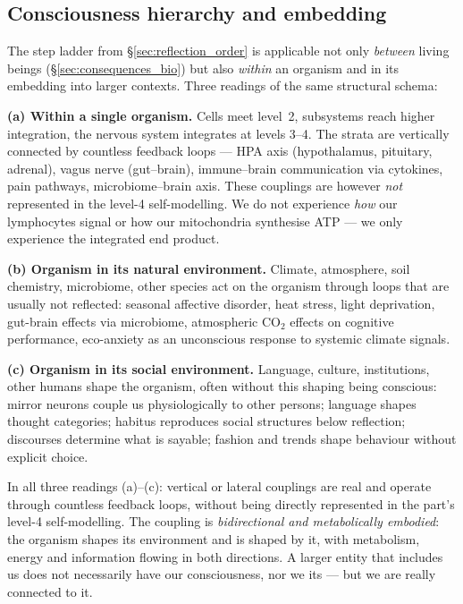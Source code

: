 \subsection{Consciousness hierarchy and embedding}\label{sec:consequences_embedding}

The step ladder from \S\ref{sec:reflection_order} is applicable not only \emph{between} living beings (\S\ref{sec:consequences_bio}) but also \emph{within} an organism and in its embedding into larger contexts. Three readings of the same structural schema:

\textbf{(a) Within a single organism.} Cells meet level~2, subsystems reach higher integration, the nervous system integrates at levels 3--4. The strata are vertically connected by countless feedback loops --- HPA axis (hypothalamus, pituitary, adrenal), vagus nerve (gut--brain), immune--brain communication via cytokines, pain pathways, microbiome--brain axis. These couplings are however \emph{not} represented in the level-4 self-modelling. We do not experience \emph{how} our lymphocytes signal or how our mitochondria synthesise ATP --- we only experience the integrated end product.

\textbf{(b) Organism in its natural environment.} Climate, atmosphere, soil chemistry, microbiome, other species act on the organism through loops that are usually not reflected: seasonal affective disorder, heat stress, light deprivation, gut-brain effects via microbiome, atmospheric CO$_2$ effects on cognitive performance, eco-anxiety as an unconscious response to systemic climate signals.

\textbf{(c) Organism in its social environment.} Language, culture, institutions, other humans shape the organism, often without this shaping being conscious: mirror neurons couple us physiologically to other persons; language shapes thought categories; habitus reproduces social structures below reflection; discourses determine what is sayable; fashion and trends shape behaviour without explicit choice.

\begin{important}
In all three readings (a)--(c): vertical or lateral couplings are real and operate through countless feedback loops, without being directly represented in the part's level-4 self-modelling. The coupling is \emph{bidirectional and metabolically embodied}: the organism shapes its environment and is shaped by it, with metabolism, energy and information flowing in both directions. A larger entity that includes us does not necessarily have our consciousness, nor we its --- but we are really connected to it.
\end{important}

